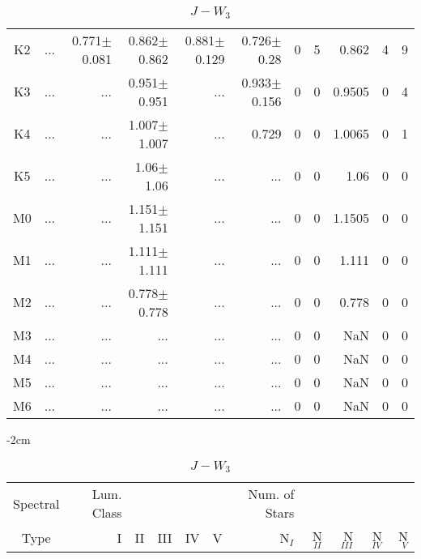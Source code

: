 \begin{table}[t]
\begin{table}[t]
\begin{center}
\begin{tabular}{c|rrrrr|rrrrr}
    K2	&	 ...	&	0.771$\pm$0.081	&	0.862$\pm$0.862	&	0.881$\pm$0.129	&	0.726$\pm$0.28	&	0	&	5	&	0.862	&	4	&	9	\\
    K3	&	 ...	&	 ...	&	0.951$\pm$0.951	&	 ...	&	0.933$\pm$0.156	&	0	&	0	&	0.9505	&	0	&	4	\\
    K4	&	 ...	&	 ...	&	1.007$\pm$1.007	&	 ...	&	0.729	&	0	&	0	&	1.0065	&	0	&	1	\\
    K5	&	 ...	&	 ...	&	1.06$\pm$1.06	&	 ...	&	 ...	&	0	&	0	&	1.06	&	0	&	0	\\
    M0	&	 ...	&	 ...	&	1.151$\pm$1.151	&	 ...	&	 ...	&	0	&	0	&	1.1505	&	0	&	0	\\
    M1	&	 ...	&	 ...	&	1.111$\pm$1.111	&	 ...	&	 ...	&	0	&	0	&	1.111	&	0	&	0	\\
    M2	&	 ...	&	 ...	&	0.778$\pm$0.778	&	 ...	&	 ...	&	0	&	0	&	0.778	&	0	&	0	\\
    M3	&	 ...	&	 ...	&	 ...	&	 ...	&	 ...	&	0	&	0	&	NaN	&	0	&	0	\\
    M4	&	 ...	&	 ...	&	 ...	&	 ...	&	 ...	&	0	&	0	&	NaN	&	0	&	0	\\
    M5	&	 ...	&	 ...	&	 ...	&	 ...	&	 ...	&	0	&	0	&	NaN	&	0	&	0	\\
    M6	&	 ...	&	 ...	&	 ...	&	 ...	&	 ...	&	0	&	0	&	NaN	&	0	&	0	\\
        \bottomrule
        \end{tabular}
    \end{center}
    \end{table}
    
    
    \begin{table}[t]
    \tiny
    \centering
    \caption{$J-W_{3}$}
    \begin{center}
        \addtolength{\leftskip} {-2cm}
        \addtolength{\rightskip}{-2cm}
        \begin{tabular}{c|rrrrr|rrrrr}
        \toprule
        Spectral & Lum. Class & & & & & Num. of Stars & & & &  \\
        Type & I & II & III &  IV & V & N$_{I}$ & N$_{II}$ & N$_{III}$ & N$_{IV}$ & N$_{V}$ \\ \midrule
      

\end{tabular}
\end{center}
\end{table}
\end{table}
